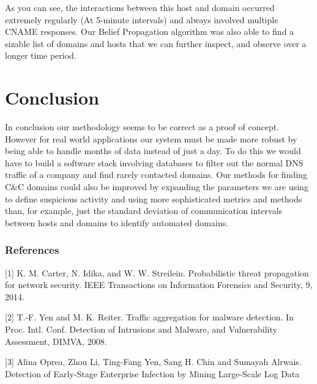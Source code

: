 \documentclass{article} %
\begin{document}
As you can see, the interactions between this host and domain occurred extremely regularly (At 5-minute intervals) and always involved multiple CNAME responses.  Our Belief Propagation algorithm was also able to find a sizable list of domains and hosts that we can further inspect, and observe over a longer time period.

\section{Conclusion}
\label{conclusion}
In conclusion our methodology seems to be correct as a proof of concept. However for real world applications our system must be made more robust by being able to handle months of data instead of just a day. To do this we would have to build a software stack involving databases to filter out the normal DNS traffic of a company and find rarely contacted domains. Our methods for finding C\&C domains could also be improved by expanding the parameters we are using to define suspicious activity and using more sophisticated metrics and methods than, for example, just the standard deviation of communication intervals between hosts and domains to identify automated domains.


\subsubsection*{References}

\small{
[1] K. M. Carter, N. Idika, and W. W. Streilein. Probabilistic threat propagation for network security. IEEE Transactions on Information Forensics and Security, 9, 2014.

[2] T.-F. Yen and M. K. Reiter. Traffic aggregation for malware detection. In
Proc. Intl. Conf. Detection of Intrusions and Malware, and Vulnerability Assessment, DIMVA, 2008.

[3] Alina Oprea, Zhou Li, Ting-Fang Yen, Sang H. Chin and Sumayah Alrwais. Detection of Early-Stage Enterprise Infection by Mining Large-Scale Log Data
}
\end{document}
